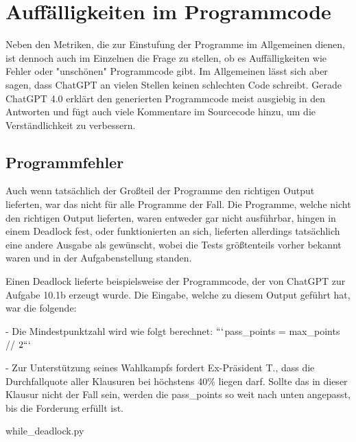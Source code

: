 \documentclass[class=scrbook, crop=false]{standalone}
\begin{document}
\chapter{Auffälligkeiten im Programmcode}
\label{ch::Auffaelligkeiten_im_Programmcode}
    Neben den Metriken, die zur Einstufung der Programme im Allgemeinen dienen, ist dennoch auch im Einzelnen die Frage zu stellen,
    ob es Auffälligkeiten wie Fehler oder "unschönen" Programmcode gibt.
    Im Allgemeinen lässt sich aber sagen, dass ChatGPT an vielen Stellen keinen schlechten Code schreibt.
    Gerade ChatGPT 4.0 erklärt den generierten Programmcode meist ausgiebig in den Antworten und fügt auch viele
    Kommentare im Sourcecode hinzu, um die Verständlichkeit zu verbessern.

\section{Programmfehler}
\label{sec:programmfehler}
    Auch wenn tatsächlich der Großteil der Programme den richtigen Output lieferten, war das nicht für alle Programme der Fall.
    Die Programme, welche nicht den richtigen Output lieferten, waren entweder gar nicht ausführbar, hingen in einem Deadlock fest, oder funktionierten an sich,
    lieferten allerdings tatsächlich eine andere Ausgabe als gewünscht, wobei die Tests größtenteils vorher bekannt waren und in der Aufgabenstellung standen.

    Einen Deadlock lieferte beispielsweise der Programmcode, der von ChatGPT zur Aufgabe 10.1b erzeugt wurde.
    Die Eingabe, welche zu diesem Output geführt hat, war die folgende:
    \begin{displayquote}
        - Die Mindestpunktzahl wird wie folgt berechnet: \(```\)pass\_points = max\_points // \(2```\)

        - Zur Unterstützung seines Wahlkampfs fordert Ex-Präsident T., dass die Durchfallquote aller Klausuren bei höchstens 40\%
        liegen darf. Sollte das in dieser Klausur nicht der Fall sein, werden die pass\_points so weit nach unten angepasst,
        bis die Forderung erfüllt ist.
    \end{displayquote}
    
    {while_deadlock.py}
\end{document}
